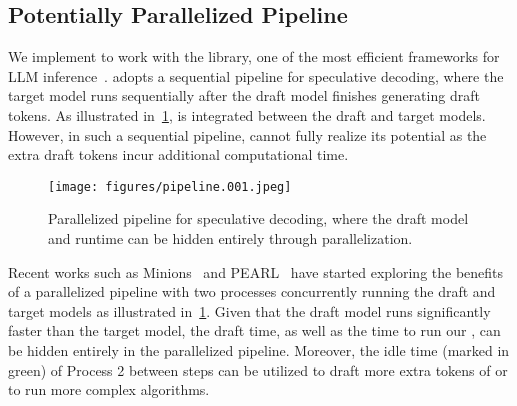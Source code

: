 \subsection{Potentially Parallelized Pipeline}\label{sec:parallel-implementation}
We implement \alg{} to work with the \vllm{} library, one of the most efficient frameworks for LLM inference~\citep{kwon2023vllm}.
\vllm{} adopts a sequential pipeline for speculative decoding, where the target model runs sequentially after the draft model finishes generating draft tokens.
As illustrated in~\cref{fig:pipeline}, \alg{} is integrated between the draft and target models.
However, in such a sequential pipeline, \alg{} cannot fully realize its potential as the extra draft tokens incur additional computational time.
\begin{figure}[!ht]
    \centering
    \texttt{[image: figures/pipeline.001.jpeg]}    
    \vspace{-3mm}
    \caption{Parallelized pipeline for speculative decoding, where the draft model and \alg{} runtime can be hidden entirely through parallelization.}
    \label{fig:pipeline}
\end{figure}

Recent works such as Minions~\citep{wang2024minions} and PEARL~\citep{liu2024parallelspeculativedecodingadaptive} have started exploring the benefits of a parallelized pipeline with two processes concurrently running the draft and target models as illustrated in~\cref{fig:pipeline}.
Given that the draft model runs significantly faster than the target model, the draft time, as well as the time to run our \alg{}, can be hidden entirely in the parallelized pipeline.
Moreover, the idle time (marked in green) of Process 2 between steps can be utilized to draft more extra tokens of \alg{} or to run more complex algorithms.

